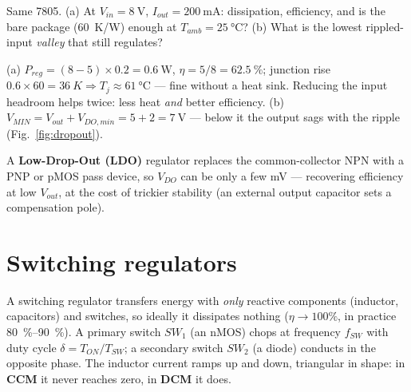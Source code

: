 \documentclass[11pt,a4paper,oneside]{book}
\begin{document}
\begin{exercise}
Same 7805. (a) At $V_{in}=\qty{8}{\volt}$, $I_{out}=\qty{200}{\milli\ampere}$:
dissipation, efficiency, and is the bare package (\qty{60}{K/W}) enough at
$T_{amb}=\qty{25}{\celsius}$? (b) What is the lowest rippled-input \emph{valley}
that still regulates?
\end{exercise}
\begin{solution}
(a) $P_{reg}=(8-5)\times0.2=\qty{0.6}{\watt}$, $\eta=5/8=\qty{62.5}{\percent}$;
junction rise $0.6\times60=\qty{36}{K}\Rightarrow
T_j\approx\qty{61}{\celsius}$ --- fine without a heat sink. Reducing the
input headroom helps twice: less heat \emph{and} better efficiency.
(b) $V_{MIN}=V_{out}+V_{DO,min}=5+2=\qty{7}{\volt}$ --- below it the output
sags with the ripple (Fig.~\ref{fig:dropout}).
\end{solution}

\begin{note}
A \textbf{Low-Drop-Out (LDO)} regulator replaces the common-collector NPN with a
PNP or pMOS pass device, so $V_{DO}$ can be only a few mV --- recovering
efficiency at low $V_{out}$, at the cost of trickier stability (an external
output capacitor sets a compensation pole).
\end{note}

\chapter{Switching regulators}\label{ch:switch}

A switching regulator transfers energy with \emph{only} reactive components
(inductor, capacitors) and switches, so ideally it dissipates nothing
($\eta\to100\%$, in practice \qtyrange{80}{90}{\percent}). A primary switch
$SW_1$ (an nMOS) chops at frequency $f_{SW}$ with duty cycle
$\delta=T_{ON}/T_{SW}$; a secondary switch $SW_2$ (a diode) conducts in the
opposite phase. The inductor current ramps up and down, triangular in shape:
in \textbf{CCM} it never reaches zero, in \textbf{DCM} it does.
\end{document}
